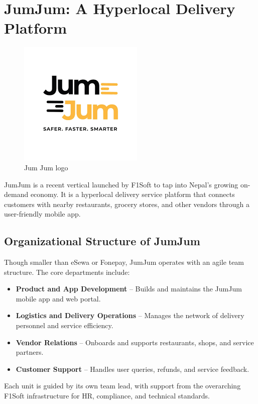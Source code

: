 \documentclass[12pt, a4paper]{report}
\begin{document}
\section{JumJum: A Hyperlocal Delivery Platform}
\begin{figure}[h]
\centering
\includegraphics[scale=1]{images/jumjum.png}
\caption{Jum Jum logo}
\end{figure}

JumJum is a recent vertical launched by F1Soft to tap into Nepal’s growing on-demand economy. It is a hyperlocal delivery service platform that connects customers with nearby restaurants, grocery stores, and other vendors through a user-friendly mobile app.
\vspace{18pt}
\subsection{Organizational Structure of JumJum}

Though smaller than eSewa or Fonepay, JumJum operates with an agile team structure. The core departments include:

\begin{itemize}
 \item \textbf{Product and App Development} – Builds and maintains the JumJum mobile app and web portal.
  \item \textbf{Logistics and Delivery Operations} – Manages the network of delivery personnel and service efficiency.
  \item \textbf{Vendor Relations} – Onboards and supports restaurants, shops, and service partners.
  \item \textbf{Customer Support} – Handles user queries, refunds, and service feedback.
\end{itemize}

Each unit is guided by its own team lead, with support from the overarching F1Soft infrastructure for HR, compliance, and technical standards.
\end{document}
